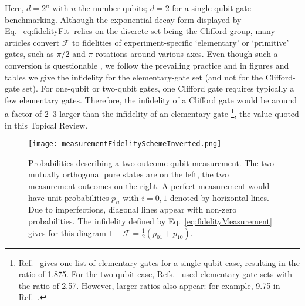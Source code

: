 \documentclass[aps, prx, showpacs, twocolumn, superscriptaddress, notitlepage, longbibliography, floatfix, nofootinbib]{revtex4-2}
\begin{document}
Here, $d=2^n$ with $n$ the number qubits; $d=2$ for a single-qubit gate benchmarking. Although the exponential decay form displayed by Eq.~\eqref{eq:fidelityFit} relies on the discrete set being the Clifford group, many articles convert $\mathcal{F}$ to fidelities of experiment-specific `elementary' or `primitive' gates, such as $\pi/2$ and $\pi$ rotations around various axes. Even though such a conversion is questionable \cite{magesan_characterizing_2012}, we follow the prevailing practice and in figures and tables we give the infidelity for the elementary-gate set (and not for the Clifford-gate set). For one-qubit or two-qubit gates, one Clifford gate requires typically a few elementary gates. Therefore, the infidelity of a Clifford gate would be around a factor of 2--3 larger than the infidelity of an elementary gate \footnote{Ref.~\cite{epstein_investigating_2014} gives one list of elementary gates for a single-qubit case, resulting in the ratio of 1.875. For the two-qubit case, Refs.~\cite{huang_fidelity_2019, petit_universal_2020} used elementary-gate sets with the ratio of 2.57. However, larger ratios also appear: for example, 9.75 in Ref.~\cite{xue_benchmarking_2019}.}, the value quoted in this Topical Review. 

\begin{figure}
  \texttt{[image: measurementFidelitySchemeInverted.png]} \hfill
  \caption{\label{fig:measurementScheme}
  Probabilities describing a two-outcome qubit measurement. The two mutually orthogonal pure states are on the left, the two measurement outcomes on the right. A perfect measurement would have unit probabilities $p_{ii}$ with $i=0,1$ denoted by horizontal lines. Due to imperfections, diagonal lines appear with non-zero probabilities. The infidelity defined by Eq.~\eqref{eq:fidelityMeasurement} gives for this diagram $1-\mathcal{F} =\frac{1}{2} (p_{01}+p_{10})$.}
\end{figure}
\end{document}
